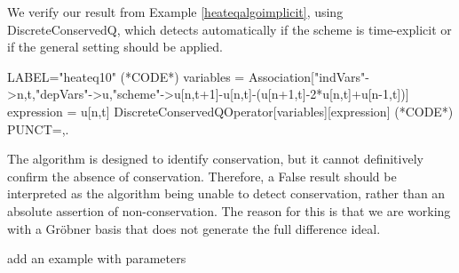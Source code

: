 \documentclass[runningheads]{llncs}
\newcommand{\1}{\chi}
\begin{document}
\begin{example}
	We verify our result from Example \ref{heateqalgoimplicit}, using {\sc DiscreteConservedQ}, which detects automatically if the scheme is time-explicit or if
	 the general setting should be applied.
	\begin{EXE}
		LABEL="heateq10"
		(*CODE*)
		variables = Association["indVars"->{n,t},"depVars"->{u},"scheme"->{u[n,t+1]-u[n,t]-(u[n+1,t]-2*u[n,t]+u[n-1,t])}]
		expression = u[n,t]
		DiscreteConservedQOperator[variables][expression]
		(*CODE*)
		PUNCT={,.}
	\end{EXE}
	\begin{small}
		
		
	\end{small}
\end{example}
\begin{remark}\label{remark}
The algorithm is designed to identify conservation, but it cannot definitively confirm the absence of conservation. Therefore, a {\sc False} result should be interpreted as the algorithm being unable to detect conservation, rather than an absolute assertion of non-conservation. The reason for this is that we are working with a Gr\"obner basis that does not generate the full difference ideal. 
\end{remark}

{\color{red} add an example with parameters}
\end{document}
